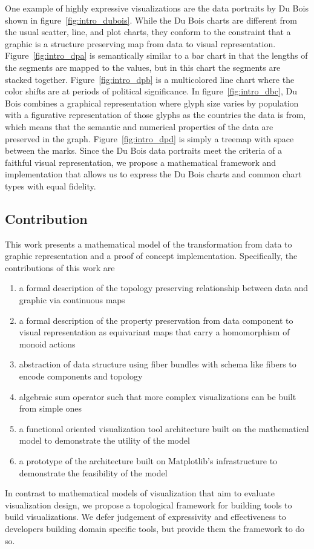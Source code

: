 \documentclass[../main.tex]{subfiles}
\begin{document}
One example of highly expressive visualizations are the data portraits by Du Bois shown in figure~\ref{fig:intro_dubois}. While the Du Bois charts are different from the usual scatter, line, and plot charts, they conform to the constraint that a graphic is a structure preserving map from data to visual representation. Figure~\ref{fig:intro_dpa} is semantically similar to a bar chart in that the lengths of the segments are mapped to the values, but in this chart the segments are stacked together. Figure~\ref{fig:intro_dpb} is a multicolored line chart where the color shifts are at periods of political significance. In figure~\ref{fig:intro_dbc}, Du Bois combines a graphical representation where glyph size varies by population with a figurative representation of those glyphs as the countries the data is from, which means that the semantic and numerical properties of the data are preserved in the graph. Figure~\ref{fig:intro_dpd} is simply a treemap\cite{heerTourVisualizationZoo2010} with space between the marks. Since the Du Bois data portraits meet the criteria of a faithful visual representation, we propose a mathematical framework and implementation that allows us to express the Du Bois charts and common chart types with equal fidelity. 

\subsection{Contribution}
This work presents a mathematical model of the transformation from data to graphic representation and a proof of concept implementation. Specifically, the contributions of this work are 
\begin{enumerate}
    \item a formal description of the topology preserving relationship between data and graphic via continuous maps
    \item a formal description of the property preservation from data component to visual representation as equivariant maps that carry a homomorphism of monoid actions
    \item abstraction of data structure using fiber bundles with schema like fibers to encode components and topology 
    \item algebraic sum operator such that more complex visualizations can be built from simple ones 
    \item a functional oriented visualization tool architecture built on the mathematical model to demonstrate the utility of the model
    \item a prototype of the architecture built on Matplotlib's infrastructure to demonstrate the feasibility of the model
\end{enumerate}
In contrast to mathematical models of visualization that aim to evaluate visualization design, we propose a topological framework for building tools to build visualizations. We defer judgement of expressivity and effectiveness to developers building domain specific tools, but provide them the framework to do so. 
\end{document}
